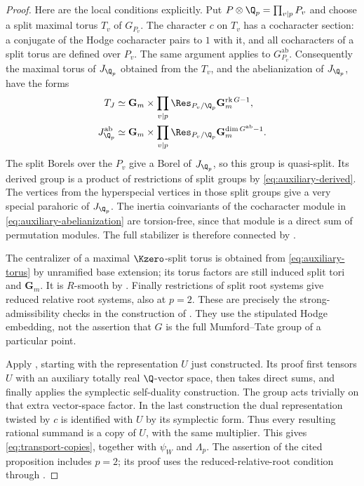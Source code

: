 \begin{proof}
Here are the local conditions explicitly.  Put $P\otimes\Q_p=
\prod_{v\mid p}P_v$ and choose a split maximal torus $T_v$ of
$G_{P_v}$.  The character $c$ on $T_v$ has a cocharacter section:
a conjugate of the Hodge cocharacter pairs to $1$ with it, and all
cocharacters of a split torus are defined over $P_v$.  The same
argument applies to $G_{P_v}^{\mathrm{ab}}$.  Consequently the
maximal torus of $J_{\Q_p}$ obtained from the $T_v$, and the
abelianization of $J_{\Q_p}$, have the forms
\begin{align}
 T_J&\simeq\mathbf G_m\times
       \prod_{v\mid p}\Res_{P_v/\Q_p}\mathbf G_m^{\operatorname{rk}G-1},
       \label{eq:auxiliary-torus}\\
 J_{\Q_p}^{\mathrm{ab}}&\simeq\mathbf G_m\times
       \prod_{v\mid p}\Res_{P_v/\Q_p}
                    \mathbf G_m^{\dim G^{\mathrm{ab}}-1}.
       \label{eq:auxiliary-abelianization}
\end{align}
The split Borels over the $P_v$ give a Borel of $J_{\Q_p}$, so this
group is quasi-split.  Its derived group is a product of restrictions
of split groups by \eqref{eq:auxiliary-derived}.  The vertices from
the hyperspecial vertices in those split groups give a very special
parahoric of $J_{\Q_p}$.  The inertia coinvariants of the cocharacter
module in \eqref{eq:auxiliary-abelianization} are torsion-free, since
that module is a direct sum of permutation modules.  The full
stabilizer is therefore connected by
\cite[Lemma~4.2.4]{KisinZhouEarlier}.

The centralizer of a maximal $\Kzero$-split torus is obtained from
\eqref{eq:auxiliary-torus} by unramified base extension; its torus
factors are still induced split tori and $\mathbf G_m$.
It is $R$-smooth by
\cite[Proposition~2.4.6]{KisinZhouEarlier}.  Finally restrictions of
split root systems give reduced relative root systems, also at
$p=2$.  These are precisely the strong-admissibility checks in the
construction of \cite[Proposition~5.3.8]{KisinZhou2025}.  They use
the stipulated Hodge embedding, not the assertion that $G$ is the
full Mumford--Tate group of a particular point.

Apply \cite[Proposition~2.1.9]{KisinZhou2025}, starting with the
representation $U$ just constructed.  Its proof first tensors $U$
with an auxiliary totally real $\Q$-vector space, then takes direct
sums, and finally applies the symplectic self-duality construction.
The group acts trivially on that extra vector-space factor.  In the
last construction the dual representation twisted by $c$ is
identified with $U$ by its symplectic form.  Thus every resulting
rational summand is a copy of $U$, with the same multiplier.  This
gives \eqref{eq:transport-copies}, together with $\psi_W$ and
$\Lambda_p$.  The assertion of the cited proposition includes
$p=2$; its proof uses the reduced-relative-root condition through
\cite[Lemma~2.1.8]{KisinZhou2025}.
\end{proof}

